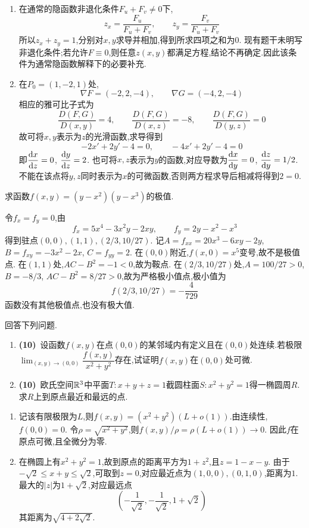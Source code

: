 \documentclass{ctexart}
\begin{document}
\begin{solution}
\begin{enumerate}[label=\tbf{(\arabic*)},leftmargin=*]
\item 在通常的隐函数非退化条件$F_u+F_v\neq0$下,
\[z_x=\dfrac{F_u}{F_u+F_v},\qquad z_y=\dfrac{F_v}{F_u+F_v}\]
所以$z_x+z_y=1$,分别对$x,y$求导并相加,得到所求四项之和为$0$.
现有题干未明写非退化条件;若允许$F\equiv0$,则任意$z(x,y)$都满足方程,结论不再确定.因此该条件为通常隐函数解释下的必要补充.
\item 在$P_0=(1,-2,1)$处,
\[\nabla F=(-2,2,-4),\qquad\nabla G=(-4,2,-4)\]
相应的雅可比子式为
\[\dfrac{D(F,G)}{D(x,y)}=4,\qquad
\dfrac{D(F,G)}{D(x,z)}=-8,\qquad
\dfrac{D(F,G)}{D(y,z)}=0\]
故可将$x,y$表示为$z$的光滑函数,求导得到
\[-2x'+2y'-4=0,\qquad -4x'+2y'-4=0\]
即$\dfrac{\mathrm{d} x}{\mathrm{d} z}=0$, $\dfrac{\mathrm{d} y}{\mathrm{d} z}=2$.
也可将$x,z$表示为$y$的函数,对应导数为$\dfrac{\mathrm{d} x}{\mathrm{d} y}=0$, $\dfrac{\mathrm{d} z}{\mathrm{d} y}=1/2$.
不能在该点将$y,z$同时表示为$x$的可微函数,否则两方程求导后相减将得到$2=0$.
\end{enumerate}
\end{solution}
\begin{problem}[3.(20\songti{分})]
求函数$f(x,y)=\left(y-x^2\right)\left(y-x^3\right)$的极值.
\end{problem}
\begin{solution}
令$f_x=f_y=0$,由
\[f_x=5x^4-3x^2y-2xy,\qquad f_y=2y-x^2-x^3\]
得到驻点$(0,0),(1,1),(2/3,10/27)$.
记$A=f_{xx}=20x^3-6xy-2y$, $B=f_{xy}=-3x^2-2x$, $C=f_{yy}=2$.
在$(0,0)$附近,$f(x,0)=x^5$变号,故不是极值点.
在$(1,1)$处,$AC-B^2=-1<0$,故为鞍点.
在$(2/3,10/27)$处,$A=100/27>0$, $B=-8/3$, $AC-B^2=8/27>0$,故为严格极小值点,极小值为
\[f(2/3,10/27)=-\dfrac4{729}\]
函数没有其他极值点,也没有极大值.
\end{solution}
\begin{problem}[4.(20\songti{分})]
回答下列问题.
        \begin{enumerate}[label=\tbf{(\arabic*)}]
            \item \textbf{(10)}\ 设函数$f(x,y)$在点$(0,0)$的某邻域内有定义且在$(0,0)$处连续.若极限$\displaystyle\lim_{(x,y)\to(0,0)}\dfrac{f(x,y)}{x^2+y^2}$存在,试证明$f(x,y)$在$(0,0)$处可微.
            \item \textbf{(10)}\ 欧氏空间$\mathbb{R}^3$中平面$T:x+y+z=1$截圆柱面$S:x^2+y^2=1$得一椭圆周$R$.求$R$上到原点最近和最远的点.
        \end{enumerate}
\end{problem}
\begin{solution}
\begin{enumerate}[label=\tbf{(\arabic*)},leftmargin=*]
\item 记该有限极限为$L$,则$f(x,y)=(x^2+y^2)(L+o(1))$.由连续性,$f(0,0)=0$.
令$\rho=\sqrt{x^2+y^2}$,则$f(x,y)/\rho=\rho(L+o(1))\to0$.
因此$f$在原点可微,且全微分为零.
\item 在椭圆上有$x^2+y^2=1$,故到原点的距离平方为$1+z^2$,且$z=1-x-y$.
由于$-\sqrt2\leqslant x+y\leqslant\sqrt2$,可取到$z=0$,对应最近点为$(1,0,0),(0,1,0)$,距离为$1$.
最大的$|z|$为$1+\sqrt2$,对应最远点
\[\left(-\dfrac1{\sqrt2},-\dfrac1{\sqrt2},1+\sqrt2\right)\]
其距离为$\sqrt{4+2\sqrt2}$.
\end{enumerate}
\end{solution}
\end{document}
